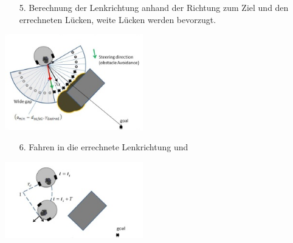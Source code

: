 \documentclass[a0paper,portrait]{baposter}
\begin{document}
\begin{poster}
{\begin{center}
\end{center}
\begin{itemize}
\item[5.] Berechnung der Lenkrichtung anhand der Richtung zum Ziel und den errechneten Lücken, weite Lücken werden bevorzugt.
\end{itemize}
\begin{center}
	\includegraphics[width=6cm]{Bilder/navigation2}
\end{center}
\begin{itemize}
\item[6.] Fahren in die errechnete Lenkrichtung und 
\end{itemize}
\begin{center}
	\includegraphics[width=6cm]{Bilder/navigation4}
\end{center}
}




\end{poster}
\end{document}
